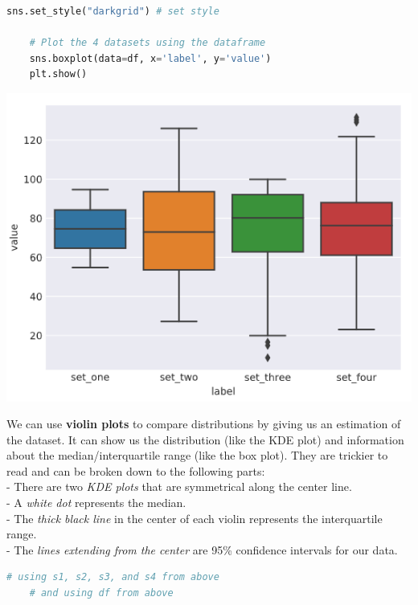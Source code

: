 \documentclass[11pt, a4paper]{article}
\begin{document}
\begin{spacing}{1.1}
\begin{minipage}[c]{10.3cm}
\begin{lstlisting}[language=Python]
	sns.set_style("darkgrid") # set style
	
	# Plot the 4 datasets using the dataframe
	sns.boxplot(data=df, x='label', y='value')
	plt.show()	\end{lstlisting}\vspace*{1mm}
	\end{minipage}
	\begin{minipage}[c]{10cm}
	\includegraphics[scale=.48]{bpdist}
	\end{minipage} \newpage
	\noindent We can use \textbf{violin plots} to compare distributions by giving us an estimation of the dataset. It can show us the distribution (like the KDE plot) and information about the median/interquartile range (like the box plot). They are trickier to read and can be broken down to the following parts: \\
	\hspace*{3mm} - There are two \textit{KDE plots} that are symmetrical along the center line. \\
	\hspace*{3mm} - A \textit{white dot} represents the median. \\
	\hspace*{3mm} - The \textit{thick black line} in the center of each violin represents the interquartile range. \\
	\hspace*{3mm} - The \textit{lines extending from the center} are 95\% confidence intervals for our data. \\
	\begin{minipage}[c]{10.3cm}
	\begin{lstlisting}[language=Python]
	# using s1, s2, s3, and s4 from above
	# and using df from above
	

\end{lstlisting}
\end{minipage}
\end{spacing}
\end{document}
